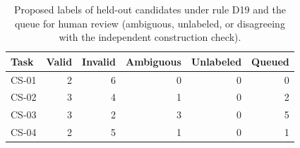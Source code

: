 \begin{table}[t]\centering\footnotesize
\caption{Proposed labels of held-out candidates under rule D19 and the queue for human review (ambiguous, unlabeled, or disagreeing with the independent construction check).}\label{tab:labels}
\begin{tabular}{lrrrrr}\toprule Task & Valid & Invalid & Ambiguous & Unlabeled & Queued \\\midrule
CS-01 & 2 & 6 & 0 & 0 & 0 \\
CS-02 & 3 & 4 & 1 & 0 & 2 \\
CS-03 & 3 & 2 & 3 & 0 & 5 \\
CS-04 & 2 & 5 & 1 & 0 & 1 \\
\bottomrule\end{tabular}\end{table}
